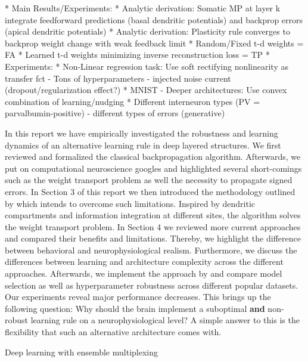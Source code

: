 \documentclass[colorinlistoftodos]{article}
\theoremstyle{definition}
\newcommand{\rob}[1]{\todo[color=red!40]{Rob: #1}}
\begin{document}
* Main Results/Experiments:
    * Analytic derivation: Somatic MP at layer k integrate feedforward predictions (basal dendritic potentials) and backprop errors (apical dendritic potentials)
    * Analytic derivation: Plasticity rule converges to backprop weight change with weak feedback limit
    * Random/Fixed t-d weights = FA
    * Learned t-d weights minimizing inverse reconstruction loss = TP
    * Experiments:
        * Non-Linear regression task: Use soft rectifying nonlinearity as transfer fct - Tons of hyperparameters - injected noise current (dropout/regularization effect?)
        * MNIST - Deeper architectures: Use convex combination of learning/nudging
* Different interneuron types (PV = parvalbumin-positive) - different types of errors (generative)


In this report we have empirically investigated the robustness and learning dynamics of an alternative learning rule in deep layered structures.
We first reviewed and formalized the classical backpropagation algorithm. Afterwards, we put on computational neuroscience googles and highlighted several short-comings such as the weight transport problem as well the necessity to propagate signed errors.
In Section 3 of this report we then introduced the methodology outlined by \citet{guerguiev2017} which intends to overcome such limitations. Inspired by dendritic compartments and information integration at different sites, the algorithm solves the weight transport problem.
In Section 4 we reviewed more current approaches and compared their benefits and limitations. Thereby, we highlight the difference between behavioral and neurophysiological realism. Furthermore, we discuss the differences between learning and architecture complexity across the different approaches. 
Afterwards, we implement the approach by \citet{guerguiev2017} and compare model selection as well as hyperparameter robustness across different popular datasets. Our experiments reveal major performance decreases. This brings up the following question: Why should the brain implement a suboptimal \textbf{and} non-robust learning rule on a neurophysiological level? A simple answer to this is the flexibility that such an alternative architecture comes with.

Deep learning with ensemble multiplexing \rob{Add ideas from Blake ICLR 2018 talk}
\end{document}
